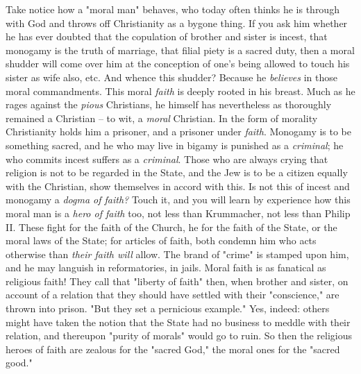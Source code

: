 Take notice how a "{}moral man"{} behaves, who today often thinks he is 
through with God and throws off Christianity as a bygone thing. If you ask him 
whether he has ever doubted that the copulation of brother and sister is 
incest, that monogamy is the truth of marriage, that filial piety is a sacred 
duty, then a moral shudder will come over him at the conception of one's being 
allowed to touch his sister as wife also, etc. And whence this shudder? 
Because he \textit{believes} in those moral commandments. This moral 
\textit{faith} is deeply rooted in his breast. Much as he rages against the 
\textit{pious} Christians, he himself has nevertheless as thoroughly remained 
a Christian -- to wit, a \textit{moral} Christian. In the form of morality 
Christianity holds him a prisoner, and a prisoner under \textit{faith}. 
Monogamy is to be something sacred, and he who may live in bigamy is punished 
as a \textit{criminal}; he who commits incest suffers as a \textit{criminal}. 
Those who are always crying that religion is not to be regarded in the State, 
and the Jew is to be a citizen equally with the Christian, show themselves in 
accord with this. Is not this of incest and monogamy a \textit{dogma of 
faith?} Touch it, and you will learn by experience how this moral man is a 
\textit{hero of faith} too, not less than Krummacher, not less than Philip II. 
These fight for the faith of the Church, he for the faith of the State, or the 
moral laws of the State; for articles of faith, both condemn him who acts 
otherwise than \textit{their faith will} allow. The brand of "{}crime"{} is 
stamped upon him, and he may languish in reformatories, in jails. Moral faith 
is as fanatical as religious faith! They call that "{}liberty of faith"{} 
then, when brother and sister, on account of a relation that they should have 
settled with their "{}conscience,"{} are thrown into prison. "{}But they set a 
pernicious example."{} Yes, indeed: others might have taken the notion that 
the State had no business to meddle with their relation, and thereupon 
"{}purity of morals"{} would go to ruin. So then the religious heroes of faith 
are zealous for the "{}sacred God,"{} the moral ones for the "{}sacred 
good."{}

